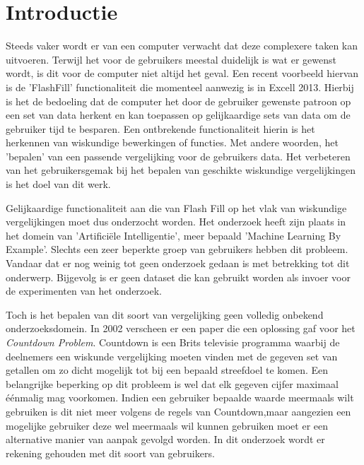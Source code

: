 \documentclass[Main.tex]{subfiles}
\begin{document}
\section{Introductie}
Steeds vaker wordt er van een computer verwacht dat deze complexere taken kan uitvoeren. Terwijl het voor de gebruikers meestal duidelijk is wat er gewenst wordt, is dit voor de computer niet altijd het geval. Een recent voorbeeld hiervan is de 'FlashFill' functionaliteit die momenteel aanwezig is in Excell 2013. Hierbij is het de bedoeling dat de computer het door de gebruiker gewenste patroon op een set van data herkent en kan toepassen op gelijkaardige sets van data om de gebruiker tijd te besparen. Een ontbrekende functionaliteit hierin is het herkennen van wiskundige bewerkingen of functies. Met andere woorden, het 'bepalen' van een passende vergelijking voor de gebruikers data. Het verbeteren van het gebruikersgemak bij het bepalen van geschikte wiskundige vergelijkingen is het doel van dit werk. \par  %

Gelijkaardige functionaliteit aan die van Flash Fill op het vlak van wiskundige vergelijkingen moet dus onderzocht worden. Het onderzoek heeft zijn plaats in het domein van 'Artifici\"ele Intelligentie', meer bepaald 'Machine Learning By Example'. Slechts een zeer beperkte groep van gebruikers hebben dit probleem. Vandaar dat er nog weinig tot geen onderzoek gedaan is met betrekking tot dit onderwerp. Bijgevolg is er geen dataset die kan gebruikt worden als invoer voor de experimenten van het onderzoek.  \par

Toch is het bepalen van dit soort van vergelijking geen volledig onbekend onderzoeksdomein. In 2002 verscheen er een paper die een oplossing gaf voor het \textit{Countdown Problem}. Countdown is een Brits televisie programma waarbij de deelnemers een wiskunde vergelijking moeten vinden met de gegeven set van getallen om zo dicht mogelijk tot bij een bepaald streefdoel te komen. Een belangrijke beperking op dit probleem is wel dat elk gegeven cijfer maximaal \'e\'enmalig mag voorkomen. Indien een gebruiker bepaalde waarde meermaals wilt gebruiken is dit niet meer volgens de regels van Countdown,maar aangezien een mogelijke gebruiker deze wel meermaals wil kunnen gebruiken moet er een alternative manier van aanpak gevolgd worden. In dit onderzoek wordt er rekening gehouden met dit soort van gebruikers.
\end{document}

